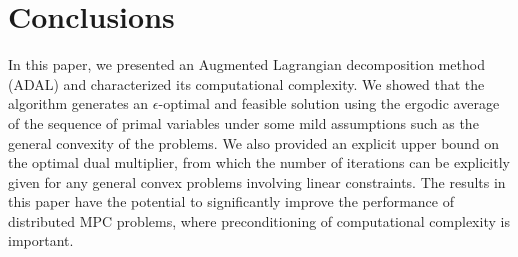 \documentclass[doublecolumn]{IEEEtran}
\begin{document}
\section{Conclusions}\label{sec_concl}

In this paper, we presented an Augmented Lagrangian decomposition method (ADAL)
and characterized its computational complexity. We showed that the algorithm generates an $\epsilon$-optimal and feasible solution using the ergodic average of the sequence of primal variables under some mild assumptions such as the general convexity of the problems.
We also provided an explicit upper bound on the optimal dual multiplier, from which the number of iterations can be explicitly given for any general convex problems involving linear constraints.
The results in this paper have the potential to significantly improve the performance of distributed MPC problems,
where preconditioning of computational complexity is important.

\appendix
\end{document}
